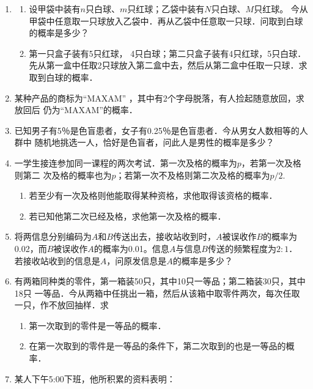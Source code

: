\begin{enumerate}
    \item \begin{enumerate}
        \item 设甲袋中装有$n$只白球、$m$只红球；乙袋中装有$N$只白球、$M$只红球。
        今从甲袋中任意取一只球放入乙袋中．再从乙袋中任意取一只球．问取到白球的概率是多少？
        \item 第一只盒子装有5只红球， 4只白球；第二只盒子装有4只红球，5只白球． 
        先从第一盒中任取2只球放入第二盒中去，然后从第二盒中任取一只球．求取到白球的概率．
    \end{enumerate}


    \item 某种产品的商标为“MAXAM” ，其中有2个字母脱落，有人捡起随意放回，求放回后
    仍为“MAXAM”的概率．


    \item 已知男子有5％是色盲患者，女子有0.25％是色盲患者．今从男女人数相等的人群中
    随机地挑选一人，恰好是色盲者，问此人是男性的概率是多少？

    
    \item 一学生接连参加同一课程的两次考试．第一次及格的概率为$p$，若第一次及格则第二
    次及格的概率也为$p$；若第一次不及格则第二次及格的概率为$p/2$.
    \begin{enumerate}
        \item 若至少有一次及格则他能取得某种资格，求他取得该资格的概率．
        \item 若已知他第二次已经及格，求他第一次及格的概率．
    \end{enumerate}




    \item 将两信息分别编码为$A$和$B$传送出去，接收站收到时，$A$被误收作$B$的概率为
    0.02，而$B$被误收作$A$的概率为0.01。信息$A$与信息$B$传送的频繁程度为$2:1$．
    若接收站收到的信息是$A$，问原发信息是$A$的概率是多少？


    \item 有两箱同种类的零件，第一箱装50只，其中10只一等品；第二箱装30只，其中18只
    一等品．今从两箱中任挑出一箱，然后从该箱中取零件两次，每次任取一只，作不放回抽样．求
    \begin{enumerate}
        \item 第一次取到的零件是一等品的概率．
        \item 在第一次取到的零件是一等品的条件下，第二次取到的也是一等品的概率．
    \end{enumerate}


    \item 某人下午5:00下班，他所积累的资料表明：
    

\end{enumerate}
